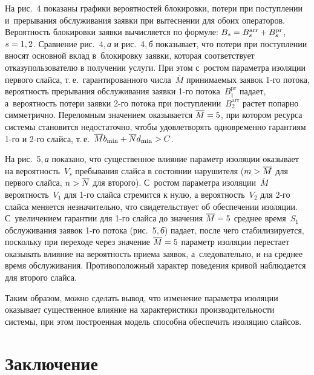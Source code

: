 \begin{multicols}{2}
  На рис.~4 показаны графики вероятностей блокировки, потери при 
поступлении и~прерывания обслуживания заявки при вытеснении для 
обоих операторов. Вероятность блокировки заявки вы\-чис\-ля\-ет\-ся по 
формуле: $B_s\hm= B_s^{\mathrm{arr}}\hm+ B_s^{\mathrm{pr}}$, $s\hm=1,2$.
 Сравнение рис.~4,\,\textit{а} и рис.~4,\,\textit{б} показывает, что потери 
при поступлении вносят основной вклад в~блокировку заявки, которая 
соответствует отказу\linebreak пользователю в получении услуги. При этом с~рос\-том 
параметра изоляции первого слайса, т.\,е.\ гарантированного 
числа~$\overline{M}$ принимаемых заявок \mbox{1-го} потока, вероятность 
прерывания обслуживания заявки 1-го потока~$B_1^{\mathrm{pr}}$ падает, 
а~вероятность потери заявки 2-го потока при поступлении~$B_2^{\mathrm{arr}}$ растет 
попарно симметрично. Переломным значением оказывается 
$\overline{M}\hm=5$, при котором ресурса системы становится 
недостаточно, чтобы удовлетворять одновременно гарантиям 1-го и 2-го 
слайса, т.\,е.\ $\overline{M} b_{\min} \hm+ \overline{N} d_{\min}\hm>C$.
  
  На рис.~5,\,\textit{а} показано, что существенное влияние параметр 
изоляции оказывает на вероятность~$V_s$ пребывания слайса в состоянии 
нарушителя ($m\hm> \overline{M}$ для первого слайса, $n\hm> \overline{N}$ 
для второго). С~ростом параметра изоляции~$\overline{M}$ 
вероятность~$V_1$ для 1-го слайса стремится к нулю, а вероятность~$V_2$ 
для 2-го слайса меняется незначительно, что свидетельствует об 
обеспечении изоляции. С~увеличением гарантии для 1-го слайса до 
значения $\overline{M}\hm=5$ среднее время~$S_1$ обслуживания заявок 
1-го потока (рис.~5,\,\textit{б}) падает, после чего стабилизируется, поскольку 
при переходе через значение $\overline{M}\hm=5$ параметр изоляции 
перестает оказывать влияние на вероятность приема заявок, 
а~следовательно, и на среднее время обслуживания. Противоположный 
характер поведения кривой наблюдается для второго слайса. 
  
  Таким образом, можно сделать вывод, что изменение параметра 
изоляции оказывает существенное влияние на характеристики 
про\-из\-во\-ди\-тель\-ности сис\-те\-мы, при этом построенная модель способна 
обеспечить изоляцию слайсов.

\vspace*{-10pt}
  
  \section{Заключение}
  

\end{multicols}
